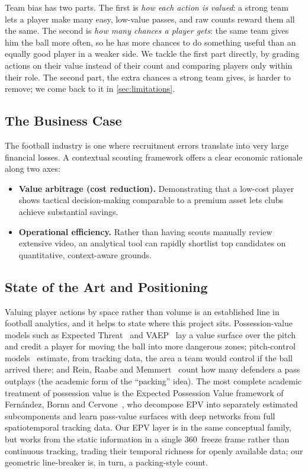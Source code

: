 \documentclass[12pt,a4paper]{article}
\begin{document}
Team bias has two parts. The first is \emph{how each action is valued}: a strong team lets a player make many easy, low-value passes, and raw counts reward them all the same. The second is \emph{how many chances a player gets}: the same team gives him the ball more often, so he has more chances to do something useful than an equally good player in a weaker side. We tackle the first part directly, by grading actions on their value instead of their count and comparing players only within their role. The second part, the extra chances a strong team gives, is harder to remove; we come back to it in \cref{sec:limitations}.

\subsection{The Business Case}\label{sec:business}

The football industry is one where recruitment errors translate into very large financial losses.
A contextual scouting framework offers a clear economic rationale along two axes:

\begin{itemize}
    \item \textbf{Value arbitrage (cost reduction).} Demonstrating that a low-cost player shows tactical decision-making comparable to a premium asset lets clubs achieve substantial savings.
    \item \textbf{Operational efficiency.} Rather than having scouts manually review extensive video, an analytical tool can rapidly shortlist top candidates on quantitative, context-aware grounds.
\end{itemize}

\subsection{State of the Art and Positioning}\label{sec:related}

Valuing player actions by space rather than volume is an established line in football analytics, and it helps to state where this project sits. Possession-value models such as Expected Threat~\cite{xt} and VAEP~\cite{vaep} lay a value surface over the pitch and credit a player for moving the ball into more dangerous zones; pitch-control models~\cite{pitchcontrol} estimate, from tracking data, the area a team would control if the ball arrived there; and Rein, Raabe and Memmert~\cite{packing} count how many defenders a pass outplays (the academic form of the ``packing'' idea). The most complete academic treatment of possession value is the Expected Possession Value framework of Fern\'{a}ndez, Bornn and Cervone~\cite{epvframework}, who decompose EPV into separately estimated subcomponents and learn pass-value surfaces with deep networks from full spatiotemporal tracking data. Our EPV layer is in the same conceptual family, but works from the static information in a single 360~freeze frame rather than continuous tracking, trading their temporal richness for openly available data; our geometric line-breaker is, in turn, a packing-style count.
\end{document}
